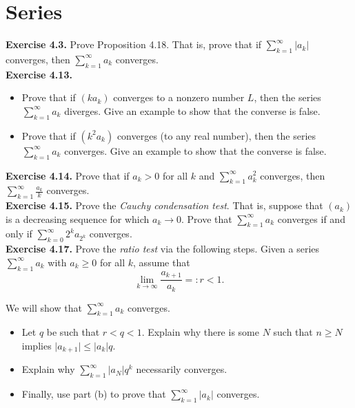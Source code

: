 \documentclass[12pt]{article}
\begin{document}
\section{Series}

\noindent\textbf{Exercise 4.3.} Prove Proposition 4.18. That is, prove that if $\sum_{k=1}^{\infty}\vert a_k \vert$ converges, then $\sum_{k=1}^{\infty} a_k$ converges.\\



\noindent\textbf{Exercise 4.13.} 
\begin{itemize}
    \item [(a)] Prove that if \(\left(ka_k\right)\) converges to a nonzero number \(L\), then the series \(\sum_{k=1}^{\infty} a_k\) diverges. Give an example to show that the converse is false.
    \item [(b)] Prove that if \(\left(k^2a_k\right)\) converges (to any real number), then the series \(\sum_{k=1}^{\infty} a_k\) converges. Give an example to show that the converse is false.
\end{itemize}

\noindent\textbf{Exercise 4.14.} Prove that if \(a_k>0\) for all \(k\) and \(\sum_{k=1}^{\infty} a_k^2\) converges, then \(\sum_{k=1}^{\infty} \frac{a_k}{k}\) converges.\\

\noindent\textbf{Exercise 4.15.} Prove the \textit{Cauchy condensation test}. That is, suppose that \((a_k)\) is a decreasing sequence for which \(a_k\to0\). Prove that \(\sum_{k=1}^{\infty} a_k\) converges if and only if \(\sum_{k=0}^{\infty} 2^k a_{2^k}\) converges.\\

\noindent\textbf{Exercise 4.17.} Prove the \textit{ratio test} via the following steps. Given a series \(\sum_{k=1}^{\infty} a_k\) with \(a_k \geq 0\) for all \(k\), assume that \[\lim_{k \to \infty} \frac{a_{k+1}}{a_k} =: r<1.\]

We will show that \(\sum_{k=1}^{\infty} a_k\) converges.
\begin{itemize}
    \item [(a)] Let \(q\) be such that \(r<q<1\). Explain why there is some \(N\) such that \(n\geq N\) implies \(\vert a_{k+1} \vert \leq \vert a_k \vert q\).
    \item [(b)] Explain why \(\sum_{k=1}^{\infty} \vert a_N \vert q^k\) necessarily converges.
    \item [(c)] Finally, use part (b) to prove that \(\sum_{k=1}^{\infty} \vert a_k \vert\) converges.
\end{itemize}
\end{document}

